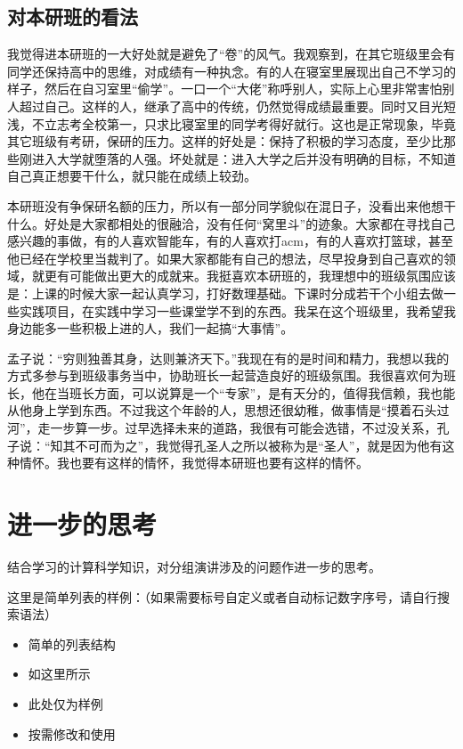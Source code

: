 \documentclass{article}
\begin{document}
\subsection{对本研班的看法}
我觉得进本研班的一大好处就是避免了“卷”的风气。我观察到，在其它班级里会有同学还保持高中的思维，对成绩有一种执念。有的人在寝室里展现出自己不学习的样子，然后在自习室里“偷学”。一口一个“大佬”称呼别人，实际上心里非常害怕别人超过自己。这样的人，继承了高中的传统，仍然觉得成绩最重要。同时又目光短浅，不立志考全校第一，只求比寝室里的同学考得好就行。这也是正常现象，毕竟其它班级有考研，保研的压力。这样的好处是：保持了积极的学习态度，至少比那些刚进入大学就堕落的人强。坏处就是：进入大学之后并没有明确的目标，不知道自己真正想要干什么，就只能在成绩上较劲。\par 
本研班没有争保研名额的压力，所以有一部分同学貌似在混日子，没看出来他想干什么。好处是大家都相处的很融洽，没有任何“窝里斗”的迹象。大家都在寻找自己感兴趣的事做，有的人喜欢智能车，有的人喜欢打acm，有的人喜欢打篮球，甚至他已经在学校里当裁判了。如果大家都能有自己的想法，尽早投身到自己喜欢的领域，就更有可能做出更大的成就来。我挺喜欢本研班的，我理想中的班级氛围应该是：上课的时候大家一起认真学习，打好数理基础。下课时分成若干个小组去做一些实践项目，在实践中学习一些课堂学不到的东西。我呆在这个班级里，我希望我身边能多一些积极上进的人，我们一起搞“大事情”。\par 
孟子说：“穷则独善其身，达则兼济天下。”我现在有的是时间和精力，我想以我的方式多参与到班级事务当中，协助班长一起营造良好的班级氛围。我很喜欢何为班长，他在当班长方面，可以说算是一个“专家”，是有天分的，值得我信赖，我也能从他身上学到东西。不过我这个年龄的人，思想还很幼稚，做事情是“摸着石头过河”，走一步算一步。过早选择未来的道路，我很有可能会选错，不过没关系，孔子说：“知其不可而为之”，我觉得孔圣人之所以被称为是“圣人”，就是因为他有这种情怀。我也要有这样的情怀，我觉得本研班也要有这样的情怀。\par 
\section{进一步的思考}
结合学习的计算科学知识，对分组演讲涉及的问题作进一步的思考。\par

这里是简单列表的样例：（如果需要标号自定义或者自动标记数字序号，请自行搜索语法）
\begin{itemize}
    \item 简单的列表结构 
    \item 如这里所示
    \item 此处仅为样例
    \item 按需修改和使用
\end{itemize}
\end{document}
